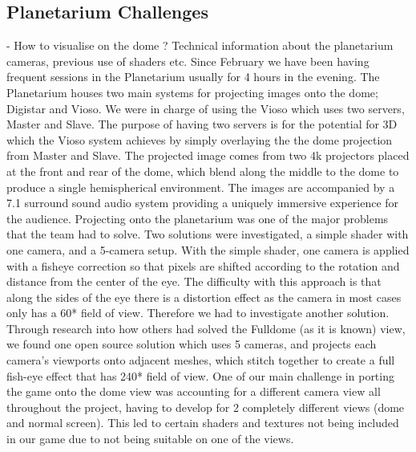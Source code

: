 \documentclass[11pt,a4paper]{article}
\begin{document}
    \subsection{Planetarium Challenges}
     - How to visualise on the dome ? Technical information about the planetarium cameras, previous use of shaders etc.
     Since February we have been having frequent sessions in the Planetarium usually for 4 hours in the evening. The Planetarium houses two main systems for projecting images onto the dome; Digistar and Vioso. We were in charge of using the Vioso which uses two servers, Master and Slave. The purpose of having two servers is for the potential for 3D which the Vioso system achieves by simply overlaying the the dome projection from Master and Slave.
     The projected image comes from two 4k projectors placed at the front and rear of the dome, which blend along the middle to the dome to produce a single hemispherical environment. The images are accompanied by a 7.1 surround sound audio system providing a uniquely immersive experience for the audience. 
     Projecting onto the planetarium was one of the major problems that the team had to solve. Two solutions were investigated, a simple shader with one camera, and a 5-camera setup. 
     With the simple shader, one camera is applied with a fisheye correction so that pixels are shifted according to the rotation and distance from the center of the eye. The difficulty with this approach is that along the sides of the eye there is a distortion effect as the camera in most cases only has a 60* field of view. Therefore we had to investigate another solution.
     Through research into how others had solved the Fulldome (as it is known) view, we found one open source solution which uses 5 cameras, and projects each camera's viewports onto adjacent meshes, which stitch together to create a full fish-eye effect that has 240* field of view.
     One of our main challenge in porting the game onto the dome view was accounting for a different camera view all throughout the project, having to develop for 2 completely different views (dome and normal screen). This led to certain shaders and textures not being included in our game due to not being suitable on one of the views.
\end{document}
